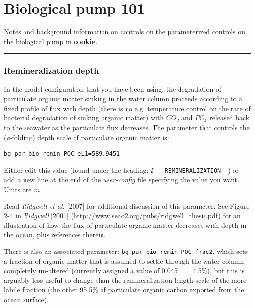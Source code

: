 \section{Biological pump 101}

Notes and background information on controls on the parameterized controls on the biological pump in \textbf{cookie}.

\vspace{1mm} \noindent\rule{4cm}{0.5pt} \vspace{2mm}

\subsubsection*{Remineralization depth}

\vspace{2mm}
In the model configuration that you have been using, the degradation of particulate organic matter sinking in the water column proceeds according to a fixed profile of flux with depth (there is no e.g. temperature control on the rate of bacterial degradation of sinking organic matter) with \(CO_{2}\) and \(PO_{4}\) released back to the seawater as the particulate flux decreases. The parameter that controls the (\textit{e}-folding) depth scale of particulate organic matter is:
\vspace{-1mm}\small\begin{verbatim}
bg_par_bio_remin_POC_eL1=589.9451
\end{verbatim}\normalsize\vspace{-1mm}
Either edit this value (found under the heading: \texttt{\# --- REMINERALIZATION ---}) or add a new line at the end of the \textit{user-config} file specifying the value you want. Units are \(m\).

\vspace{1mm}
Read \textit{Ridgwell et al.} [2007] for additional discussion of this parameter. See Figure 2-4 in \textit{Ridgwell} [2001] (http://www.seao2.org/pubs/ridgwell\_thesis.pdf) for an illustration of how the flux of particulate organic matter decreases with depth in the ocean, plus references therein.

There is also an associated parameter: \texttt{bg\_par\_bio\_remin\_POC\_frac2}, which sets a fraction of organic matter that is assumed to settle through the water column completely un-altered (currently assigned a value of 0.045 == 4.5\%), but this is arguably less useful to change than the remineralization length-scale of the more labile fraction (the other 95.5\% of particulate organic carbon exported from the ocean surface).

